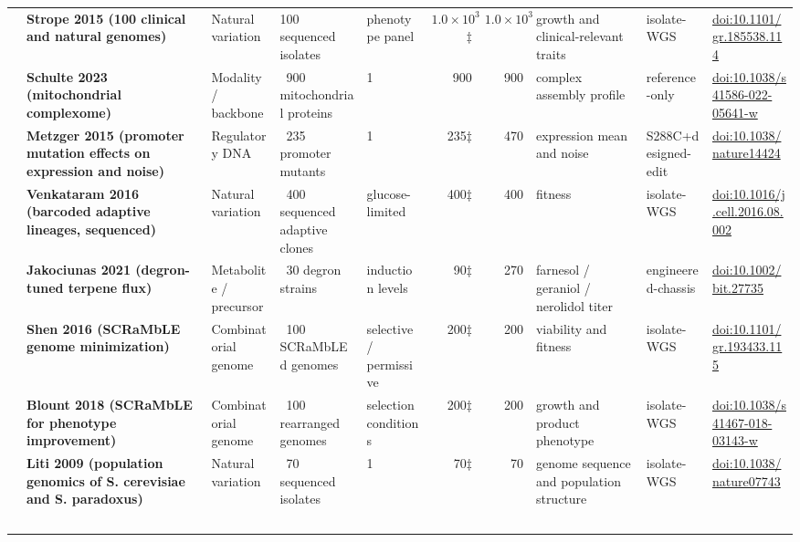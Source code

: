 \begin{landscape}
\begin{longtable}{@{}r@{\hspace{4pt}} L{42mm} L{21mm} L{26mm} L{20mm} r@{\hspace{5pt}} r@{\hspace{5pt}} L{30mm} L{23mm} L{34mm}@{}}
 & \textbf{Strope 2015 (100 clinical and natural genomes)} & Natural variation & 100 sequenced isolates & phenotype panel & $1.0\times 10^{3}$$\ddagger$ & $1.0\times 10^{3}$ & growth and clinical-relevant traits & isolate-\allowbreak WGS & \href{https://doi.org/10.1101/gr.185538.114}{doi:10.1101/\allowbreak gr.185538.114} \\
 & \textbf{Schulte 2023 (mitochondrial complexome)} & Modality / backbone & ~900 mitochondrial proteins & 1 & 900 & 900 & complex assembly profile & reference-\allowbreak only & \href{https://doi.org/10.1038/s41586-022-05641-w}{doi:10.1038/\allowbreak s41586-022-05641-w} \\
 & \textbf{Metzger 2015 (promoter mutation effects on expression and noise)} & Regulatory DNA & ~235 promoter mutants & 1 & 235$\ddagger$ & 470 & expression mean and noise & S288C+\allowbreak designed-\allowbreak edit & \href{https://doi.org/10.1038/nature14424}{doi:10.1038/\allowbreak nature14424} \\
 & \textbf{Venkataram 2016 (barcoded adaptive lineages, sequenced)} & Natural variation & ~400 sequenced adaptive clones & glucose-limited & 400$\ddagger$ & 400 & fitness & isolate-\allowbreak WGS & \href{https://doi.org/10.1016/j.cell.2016.08.002}{doi:10.1016/\allowbreak j.cell.2016.08.002} \\
 & \textbf{Jakociunas 2021 (degron-tuned terpene flux)} & Metabolite / precursor & ~30 degron strains & induction levels & 90$\ddagger$ & 270 & farnesol / geraniol / nerolidol titer & engineered-\allowbreak chassis & \href{https://doi.org/10.1002/bit.27735}{doi:10.1002/\allowbreak bit.27735} \\
 & \textbf{Shen 2016 (SCRaMbLE genome minimization)} & Combinatorial genome & ~100 SCRaMbLEd genomes & selective / permissive & 200$\ddagger$ & 200 & viability and fitness & isolate-\allowbreak WGS & \href{https://doi.org/10.1101/gr.193433.115}{doi:10.1101/\allowbreak gr.193433.115} \\
 & \textbf{Blount 2018 (SCRaMbLE for phenotype improvement)} & Combinatorial genome & ~100 rearranged genomes & selection conditions & 200$\ddagger$ & 200 & growth and product phenotype & isolate-\allowbreak WGS & \href{https://doi.org/10.1038/s41467-018-03143-w}{doi:10.1038/\allowbreak s41467-018-03143-w} \\
 & \textbf{Liti 2009 (population genomics of S. cerevisiae and S. paradoxus)} & Natural variation & ~70 sequenced isolates & 1 & 70$\ddagger$ & 70 & genome sequence and population structure & isolate-\allowbreak WGS & \href{https://doi.org/10.1038/nature07743}{doi:10.1038/\allowbreak nature07743} \\
$$
\end{longtable}
\end{landscape}
